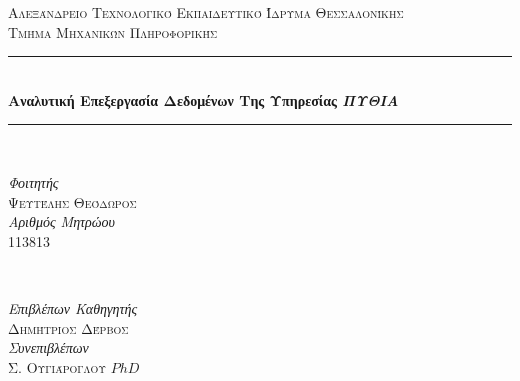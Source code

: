 \documentclass[12pt,a4paper,final]{article}
\begin{document}

\begin{titlepage} %
	\newcommand{\HRule}{\rule{\linewidth}{0.5mm}} %
	
	\center %
	
	
	\textsc{\LARGE Αλεξάνδρειο Τεχνολογικό Εκπαιδευτικό Ίδρυμα Θεσσαλονίκης\\ Τμήμα Μηχανικών Πληροφορικής}\\[1.5cm] %

	
	\HRule\\[0.4cm]
	
	{\huge\bfseries Αναλυτική Επεξεργασία Δεδομένων Της Υπηρεσίας \textit{ΠΥΘΙΑ}}\\[0.4cm] %
	
	\HRule\\[1.5cm]
	
	
	\begin{minipage}{0.4\textwidth}
		\begin{flushleft}
			\large
			\textit{Φοιτητής}\\
			\textsc{Ψευτέλης Θεόδωρος}\\ \bigskip%
			\textit{Αριθμός Μητρώου}\\
			\textsc{113813} %
		\end{flushleft}
	\end{minipage}
	~
	\begin{minipage}{0.4\textwidth}
		\begin{flushright}
			\large
			\textit{Επιβλέπων Καθηγητής}\\
			 \textsc{Δημήτριος Δέρβος}\\ \bigskip %
			\textit{Συνεπιβλέπων}\\
			 \textsc{Σ. Ουγιάρογλου $PhD$ } %
		\end{flushright}
	\end{minipage}
	

\end{titlepage}
\end{document}
